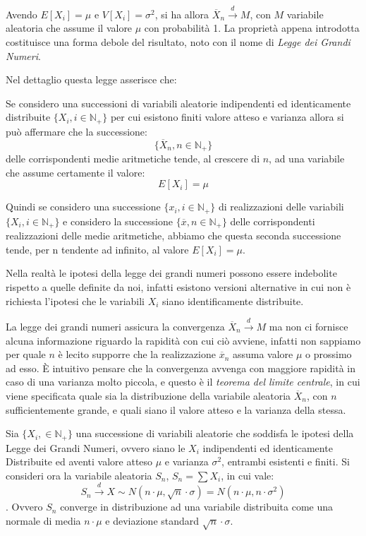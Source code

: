 \documentclass[a4paper,12pt, oneside]{book}
\newcommand{\numberset}{\mathbb}
\newcommand{\N}{\numberset{N}}
\begin{document}
Avendo $E[X_i] = \mu$ e $V[X_i] = \sigma^2$, si ha allora $\overline{X}_n \stackrel{d}{\longrightarrow} M$,
con $M$ variabile aleatoria che assume il valore $\mu$ con probabilità 1.\newline
La proprietà appena introdotta costituisce una forma debole del risultato, noto con il nome di \emph{Legge dei Grandi Numeri}.

Nel dettaglio questa legge asserisce che:
\begin{teo}
Se considero una successioni di variabili aleatorie indipendenti ed identicamente distribuite $\{X_i, i \in \N_+\}$
per cui esistono finiti valore atteso e varianza allora si può affermare che la successione:
\[\{\overline{X}_n, n \in \N_+\}\]
delle corrispondenti medie aritmetiche tende, al crescere di $n$, ad una variabile che assume certamente il valore:
\[E[X_i]=\mu\]
\end{teo}
Quindi se considero una successione $\{x_i, i \in \N_+\}$ di realizzazioni delle variabili $\{X_i, i \in \N_+\}$
e considero la successione $\{\overline{x}, n \in \N_+\}$ delle corrispondenti realizzazioni delle medie aritmetiche,
abbiamo che questa seconda successione tende, per n tendente ad infinito, al valore $E[X_i] = \mu$.

Nella realtà le ipotesi della legge dei grandi numeri possono essere indebolite rispetto a quelle definite da
noi, infatti esistono versioni alternative in cui non è richiesta l'ipotesi che le variabili $X_i$ siano
identificamente distribuite.

La legge dei grandi numeri assicura la convergenza $\overline{X}_n \stackrel{d}{\longrightarrow} M$ ma non ci
fornisce alcuna informazione riguardo la rapidità con cui ciò avviene, infatti non sappiamo per quale $n$ è
lecito supporre che la realizzazione $\overline{x}_n$ assuma valore $\mu$ o prossimo ad esso.\newline
È intuitivo pensare che la convergenza avvenga con maggiore rapidità in caso di una varianza molto piccola, e
questo è il \emph{teorema del limite centrale}, in cui viene specificata quale sia la distribuzione della
variabile aleatoria $\overline{X}_n$, con $n$ sufficientemente grande, e quali siano il valore atteso e la
varianza della stessa.

Sia $\{X_i,\in\N_+\}$ una successione di variabili aleatorie che soddisfa le ipotesi della Legge dei Grandi
Numeri, ovvero siano le $X_i$ indipendenti ed identicamente Distribuite ed aventi valore atteso $\mu$ e 
varianza $\sigma^2$, entrambi esistenti e finiti.\newline
Si consideri ora la variabile aleatoria $S_n$, $S_n = \sum X_i$, in cui vale:
\[S_n \stackrel{d}{\longrightarrow} X \sim N(n \cdot \mu, \sqrt{n} \cdot \sigma) = N(n \cdot \mu, n \cdot \sigma^2)\].
Ovvero $S_n$ converge in distribuzione ad una variabile distribuita come una normale di media $n \cdot \mu$ e
deviazione standard $\sqrt{n} \cdot \sigma$.
\end{document}
